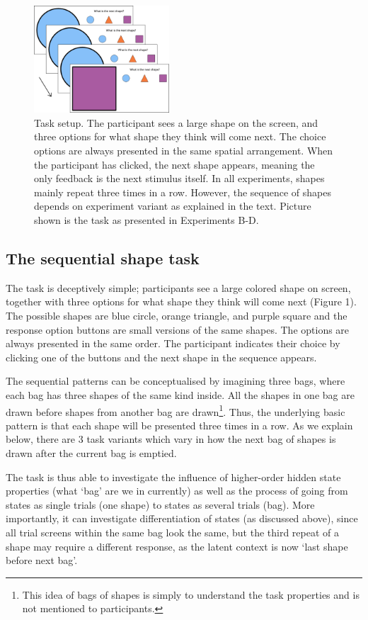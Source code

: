 \documentclass[10pt,letterpaper]{article}
\begin{document}
\begin{figure}[t]
\includegraphics[width=0.45\textwidth]{new_task_sequence.png}
\caption{Task setup. The participant sees a large shape on the screen, and three options for what shape they think will come next. The choice options are always presented in the same spatial arrangement. When the participant has clicked, the next shape appears, meaning the only feedback is the next stimulus itself. In all experiments, shapes mainly repeat three times in a row. However, the sequence of shapes depends on experiment variant as explained in the text. Picture shown is the task as presented in Experiments B-D.}
\centering
\label{fig:figure1}
\end{figure}

\subsection{The sequential shape task}
The task is deceptively simple; participants see a large colored shape on screen, together with three options for what shape they think will come next (Figure 1). The possible shapes are blue circle, orange triangle, and purple square and the response option buttons are small versions of the same shapes. The options are always presented in the same order. The participant indicates their choice by clicking one of the buttons and the next shape in the sequence appears.

The sequential patterns can be conceptualised by imagining three bags, where each bag has three shapes of the same kind inside. All the shapes in one bag are drawn before shapes from another bag are drawn\footnote{This idea of bags of shapes is simply to understand the task properties and is not mentioned to participants.}. Thus, the underlying basic pattern is that each shape will be presented three times in a row. As we explain below, there are 3 task variants which vary in how the next bag of shapes is drawn after the current bag is emptied.

The task is thus able to investigate the influence of higher-order hidden state properties (what ‘bag’ are we in currently) as well as the process of going from states as single trials (one shape) to states as several trials (bag). More importantly, it can investigate differentiation of states (as discussed above), since all trial screens within the same bag look the same, but the third repeat of a shape may require a different response, as the latent context is now ‘last shape before next bag’.
\end{document}
